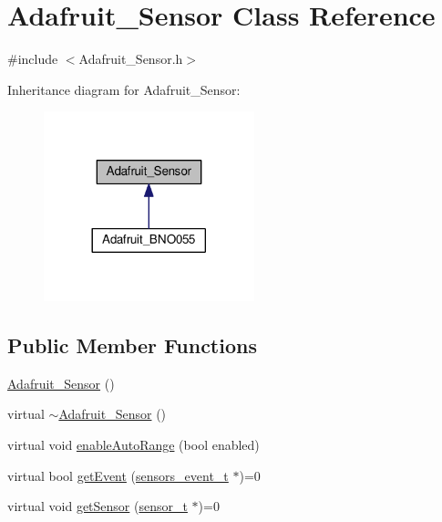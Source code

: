 \hypertarget{classAdafruit__Sensor}{}\section{Adafruit\+\_\+\+Sensor Class Reference}
\label{classAdafruit__Sensor}


{\ttfamily \#include $<$Adafruit\+\_\+\+Sensor.\+h$>$}



Inheritance diagram for Adafruit\+\_\+\+Sensor\+:\nopagebreak
\begin{figure}[H]
\begin{center}
\leavevmode
\includegraphics[width=173pt]{classAdafruit__Sensor__inherit__graph}
\end{center}
\end{figure}
\subsection*{Public Member Functions}
\begin{DoxyCompactItemize}
\item 
\hyperlink{classAdafruit__Sensor_a1d06c6f2b9d014894f47102fc1effddf}{Adafruit\+\_\+\+Sensor} ()
\item 
virtual \hyperlink{classAdafruit__Sensor_ac98df73e0cd9367a226b96668417e2e6}{$\sim$\+Adafruit\+\_\+\+Sensor} ()
\item 
virtual void \hyperlink{classAdafruit__Sensor_ace6c1f26eeb956f95801b9fc1841f3a0}{enable\+Auto\+Range} (bool enabled)
\item 
virtual bool \hyperlink{classAdafruit__Sensor_a0636562b9bc853b796ecc87b5d4b1bec}{get\+Event} (\hyperlink{structsensors__event__t}{sensors\+\_\+event\+\_\+t} $\ast$)=0
\item 
virtual void \hyperlink{classAdafruit__Sensor_a19e844c1eb2dc37cb72705d5572c4676}{get\+Sensor} (\hyperlink{structsensor__t}{sensor\+\_\+t} $\ast$)=0
\end{DoxyCompactItemize}
